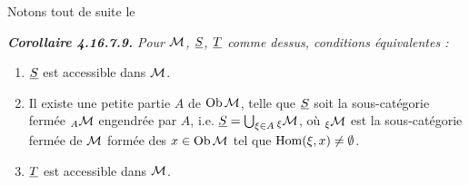 \noindent Notons tout de suite le

\begingroup\itshape
\noindent\textbf{\upshape Corollaire 4.16.7.9.} Pour $\mathcal{M}$, $\underline{S}$, $\underline{T}$ comme dessus, conditions équivalentes :
\begin{enumerate}[label={}]
\item[a)] $\underline{S}$ est accessible dans $\mathcal{M}$.
\item[a$'$)] Il existe une \textup{petite} partie $A$ de $\operatorname{Ob} \mathcal{M}$, telle que $\underline{S}$ soit la sous-catégorie fermée ${}_A\mathcal{M}$ engendrée par $A$, i.e. $\underline{S} = \bigcup_{\xi\in A} {}_\xi\mathcal{M}$, où ${}_\xi\mathcal{M}$ est la sous-catégorie fermée de $\mathcal{M}$ formée des $x \in \operatorname{Ob} \mathcal{M}$ tel que $\operatorname{Hom}(\xi, x) \neq \emptyset$.
\item[b)] $\underline{T}$ est accessible dans $\mathcal{M}$.
\end{enumerate}
\endgroup

